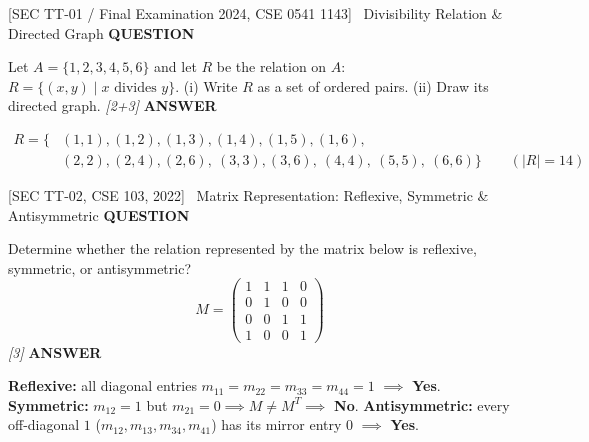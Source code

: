\documentclass[11pt,a4paper]{article}
\newcommand{\Qlabel}{\textbf{\color{navy}\footnotesize\MakeUppercase{Question}}\par\smallskip}
\newcommand{\Alabel}{\textbf{\color{teal}\footnotesize\MakeUppercase{Answer}}\par\smallskip}
\begin{document}
\newpage
\begin{exambox}{[SEC TT-01 / Final Examination 2024, CSE 0541 1143] \ Divisibility Relation \& Directed Graph}
\Qlabel
Let $A = \{1, 2, 3, 4, 5, 6\}$ and let $R$ be the relation on $A$: $R = \{(x,y) \mid x \text{ divides } y\}$. (i) Write $R$ as a set of ordered pairs. (ii) Draw its directed graph. \hfill\textit{[2+3]}
\tcblower
\Alabel
\begin{align*}
R = \{ &(1, 1), (1, 2), (1, 3), (1, 4), (1, 5), (1, 6), \\
       &(2, 2), (2, 4), (2, 6), \ (3, 3), (3, 6), \ (4, 4), \ (5, 5), \ (6, 6) \} \qquad (|R| = 14)
\end{align*}
\begin{center}
\end{center}
\end{exambox}

\begin{exambox}{[SEC TT-02, CSE 103, 2022] \ Matrix Representation: Reflexive, Symmetric \& Antisymmetric}
\Qlabel
Determine whether the relation represented by the matrix below is reflexive, symmetric, or antisymmetric?
\[
M = \begin{pmatrix}
1 & 1 & 1 & 0 \\
0 & 1 & 0 & 0 \\
0 & 0 & 1 & 1 \\
1 & 0 & 0 & 1
\end{pmatrix}
\]
\hfill\textit{[3]}
\tcblower
\Alabel
\textbf{Reflexive:} all diagonal entries $m_{11}=m_{22}=m_{33}=m_{44}=1$ $\implies$ \textbf{Yes}. \quad
\textbf{Symmetric:} $m_{12}=1$ but $m_{21}=0 \implies M \neq M^T \implies$ \textbf{No}. \quad
\textbf{Antisymmetric:} every off-diagonal $1$ ($m_{12},m_{13},m_{34},m_{41}$) has its mirror entry $0$ $\implies$ \textbf{Yes}.
\end{exambox}
\end{document}
